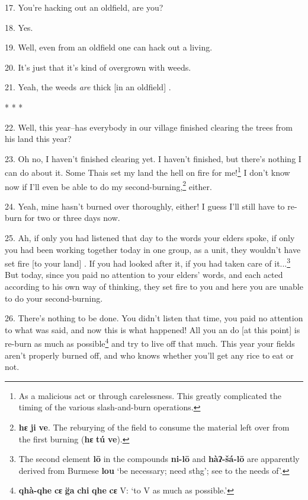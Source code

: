 17. You're hacking out an oldfield, are you?

18. Yes.

19. Well, even from an oldfield one can hack out a living.

20. It's just that it's kind of overgrown with weeds.

21. Yeah, the weeds \textit{are} thick [in an oldfield] .

\begin{center}
* * *
\end{center}

22. Well, this year--has everybody in our village finished clearing the trees from
his land this year?

23. Oh no, I haven't finished clearing yet. I haven't finished, but there's nothing
I can do about it. Some Thais set my land the hell on fire for me!\footnote{As a malicious act or through carelessness. This greatly complicated the timing of the various slash-and-burn operations.} I don't
know now if I'll even be able to do my second-burning,\footnote{\textbf{hɛ} \textbf{ji} \textbf{ve}. The reburying of the field to consume the material left over from the first burning (\textbf{hɛ} \textbf{tú} \textbf{ve}).} either.

24. Yeah, mine hasn't burned over thoroughly, either! I guess I'll still have to
re-burn for two or three days now.

25. Ah, if only you had listened that day to the words your elders spoke, if only
you had been working together today in one group, as a unit, they wouldn't have
set fire [to your land] . If you had looked after it, if you had taken care of
it...\footnote{The second element \textbf{lō} in the compounds \textbf{ni-lō} and \textbf{hàʔ-šá-lō} are apparently derived from Burmese \textbf{lou} `be necessary; need sthg'; see to the needs of'.} But today, since you paid no attention to your elders' words, and each
acted according to his own way of thinking, they set fire to you and here you are
unable to do your second-burning.

26. There's nothing to be done. You didn't listen that time, you paid no attention
to what was said, and now this is what happened! All you an do [at this point]
is re-burn as much as possible\footnote{\textbf{qhà-qhe} \textbf{cɛ} \textbf{g̈a} \textbf{chi} \textbf{qhe} \textbf{cɛ} V: `to V as much as possible.'} and try to live off that much. This year your
fields aren't properly burned off, and who knows whether you'll get any rice to
eat or not.

